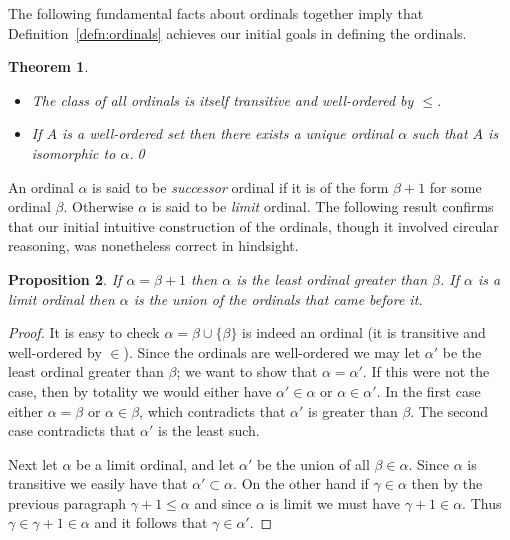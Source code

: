 \documentclass[11pt,oneside]{amsbook}
\theoremstyle{definition}
\theoremstyle{plain}
\newtheorem{theorem}{Theorem}[section]
\newtheorem{proposition}[theorem]{Proposition}
\theoremstyle{definition}
\theoremstyle{remark}
\numberwithin{equation}{section}
\numberwithin{figure}{section}
\begin{document}
The following fundamental facts about ordinals together imply that Definition~\ref{defn:ordinals} achieves our initial goals in defining the ordinals.

\begin{theorem}\
  \label{thm:ordinals}
  \begin{itemize}
  \item The class of all ordinals is itself transitive and well-ordered by $\leq$.
  \item If $A$ is a well-ordered set then there exists a unique ordinal $\alpha$ such that $A$ is isomorphic to $\alpha$.\qed
  \end{itemize}
\end{theorem}

An ordinal $\alpha$ is said to be \emph{successor} ordinal if it is of the form $\beta+1$ for some ordinal $\beta$. Otherwise $\alpha$ is said to be \emph{limit} ordinal. The following result confirms that our initial intuitive construction of the ordinals, though it involved circular reasoning, was nonetheless correct in hindsight.

\begin{proposition}
  If $\alpha=\beta+1$ then $\alpha$ is the least ordinal greater than $\beta$. If $\alpha$ is a limit ordinal then $\alpha$ is the union of the ordinals that came before it.
\end{proposition}

\begin{proof}
  It is easy to check $\alpha=\beta\cup\{\beta\}$ is indeed an ordinal (it is transitive and well-ordered by $\in$). Since the ordinals are well-ordered we may let $\alpha'$ be the least ordinal greater than $\beta$; we want to show that $\alpha=\alpha'$. If this were not the case, then by totality we would either have $\alpha'\in\alpha$ or $\alpha\in\alpha'$. In the first case either $\alpha=\beta$ or $\alpha\in\beta$, which contradicts that $\alpha'$ is greater than $\beta$. The second case contradicts that $\alpha'$ is the least such.

  Next let $\alpha$ be a limit ordinal, and let $\alpha'$ be the union of all $\beta\in\alpha$. Since $\alpha$ is transitive we easily have that $\alpha'\subset\alpha$. On the other hand if $\gamma\in\alpha$ then by the previous paragraph $\gamma+1\leq\alpha$ and since $\alpha$ is limit we must have $\gamma+1\in\alpha$. Thus $\gamma\in\gamma+1\in\alpha$ and it follows that $\gamma\in\alpha'$.
\end{proof}
\end{document}
